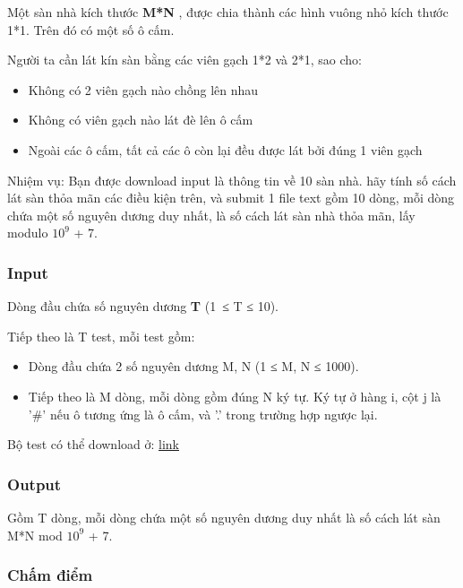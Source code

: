 



   Một sàn nhà kích thước   \textbf{    M*N   }   , được chia thành các hình vuông nhỏ kích thước 1*1. Trên đó có một số ô cấm.  

   Người ta cần lát kín sàn bằng các viên gạch 1*2 và 2*1, sao cho:  
\begin{itemize}
	\item     Không có 2 viên gạch nào chồng lên nhau   
	\item     Không có viên gạch nào lát đè lên ô cấm   
	\item     Ngoài các ô cấm, tất cả các ô còn lại đều được lát bởi đúng 1 viên gạch   
\end{itemize}

   Nhiệm vụ: Bạn được download input là thông tin về 10 sàn nhà. hãy tính số cách lát sàn thỏa mãn các điều kiện trên, và submit 1 file text gồm 10 dòng, mỗi dòng chứa một số nguyên dương duy nhất, là số cách lát sàn nhà thỏa mãn, lấy modulo $10^{9}$   + 7.  

\subsubsection{   Input  }

   Dòng đầu chứa số nguyên dương   \textbf{    T   }   (1 ≤ T ≤ 10).  

   Tiếp theo là T test, mỗi test gồm:  
\begin{itemize}
	\item     Dòng đầu chứa 2 số nguyên dương M, N (1 ≤ M, N ≤ 1000).   
	\item     Tiếp theo là M dòng, mỗi dòng gồm đúng N ký tự. Ký tự ở hàng i, cột j là '\#' nếu ô tương ứng là ô cấm, và '.' trong trường hợp ngược lại.   
\end{itemize}

   Bộ test có thể download ở:   \href{../../../content/voj:VMTILE}{    link   }

\subsubsection{   Output  }

   Gồm T dòng, mỗi dòng chứa một số nguyên dương duy nhất là số cách lát sàn M*N mod $10^{9}$   + 7.  

\subsubsection{   Chấm điểm  }

